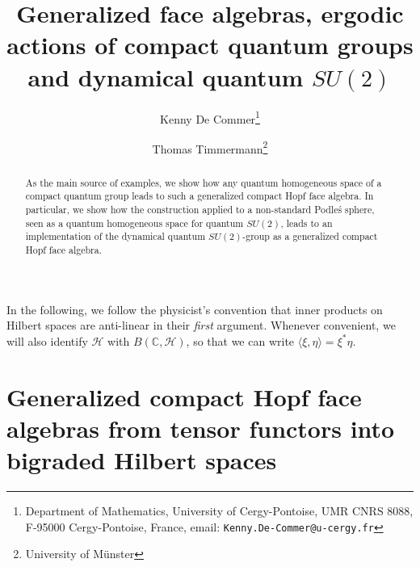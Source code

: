 \documentclass[12pt]{article}
\date{}
\theoremstyle{change}
\newcommand{\C}{\mathbb{C}}
\theoremstyle{definition}
\numberwithin{equation}{section}
\begin{document}
\title{{\scriptsize Generalized face algebras,} ergodic actions of compact quantum groups {\scriptsize and dynamical quantum $SU(2)$}}

\author{Kenny De Commer\thanks{Department of Mathematics, University of Cergy-Pontoise, UMR CNRS 8088, F-95000 Cergy-Pontoise, France, email: {\tt Kenny.De-Commer@u-cergy.fr}}
\and Thomas Timmermann\thanks{University of M\"{u}nster}}

\maketitle


\begin{abstract}
 As the main source of examples, we show how any quantum homogeneous space of a compact quantum group leads to such a generalized compact Hopf face algebra. {\scriptsize In particular, we show how the construction applied to a non-standard Podle\'{s} sphere, seen as a quantum homogeneous space for quantum $SU(2)$, leads to an implementation of the dynamical quantum $SU(2)$-group as a generalized compact Hopf face algebra.}
\end{abstract}








In the following, we follow the physicist's convention that inner products on Hilbert spaces are anti-linear in their \emph{first} argument. Whenever convenient, we will also identify $\mathscr{H}$ with $B(\C,\mathscr{H})$, so that we can write $\langle \xi,\eta\rangle = \xi^*\eta$.

\section*{Generalized compact Hopf face algebras from tensor functors into bigraded Hilbert spaces}
\end{document}
